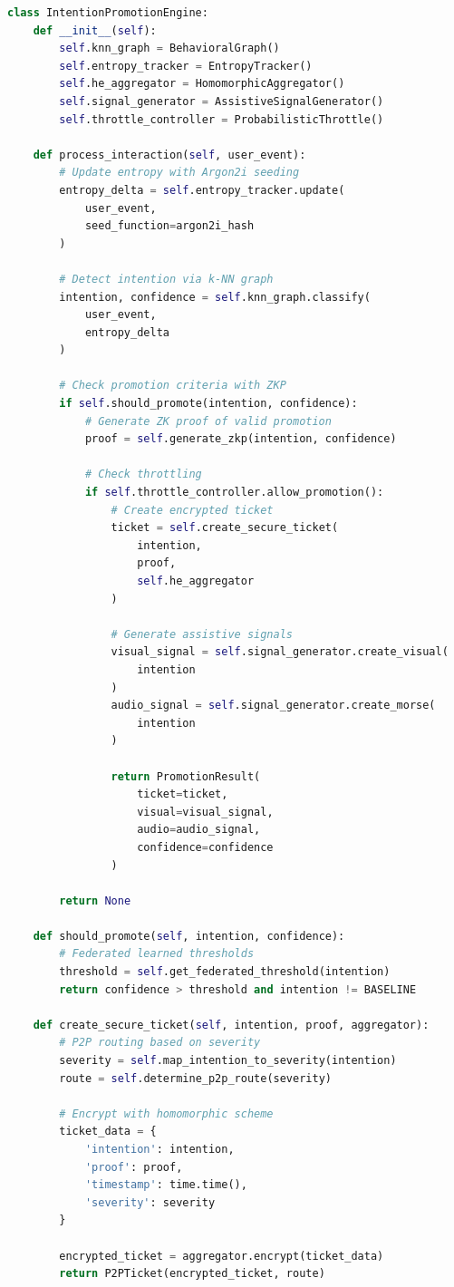 \documentclass[11pt,a4paper]{article}
\begin{document}
\begin{lstlisting}[language=Python, caption=Complete Intention Promotion Pipeline]
class IntentionPromotionEngine:
    def __init__(self):
        self.knn_graph = BehavioralGraph()
        self.entropy_tracker = EntropyTracker()
        self.he_aggregator = HomomorphicAggregator()
        self.signal_generator = AssistiveSignalGenerator()
        self.throttle_controller = ProbabilisticThrottle()
        
    def process_interaction(self, user_event):
        # Update entropy with Argon2i seeding
        entropy_delta = self.entropy_tracker.update(
            user_event, 
            seed_function=argon2i_hash
        )
        
        # Detect intention via k-NN graph
        intention, confidence = self.knn_graph.classify(
            user_event,
            entropy_delta
        )
        
        # Check promotion criteria with ZKP
        if self.should_promote(intention, confidence):
            # Generate ZK proof of valid promotion
            proof = self.generate_zkp(intention, confidence)
            
            # Check throttling
            if self.throttle_controller.allow_promotion():
                # Create encrypted ticket
                ticket = self.create_secure_ticket(
                    intention,
                    proof,
                    self.he_aggregator
                )
                
                # Generate assistive signals
                visual_signal = self.signal_generator.create_visual(
                    intention
                )
                audio_signal = self.signal_generator.create_morse(
                    intention
                )
                
                return PromotionResult(
                    ticket=ticket,
                    visual=visual_signal,
                    audio=audio_signal,
                    confidence=confidence
                )
        
        return None
    
    def should_promote(self, intention, confidence):
        # Federated learned thresholds
        threshold = self.get_federated_threshold(intention)
        return confidence > threshold and intention != BASELINE
    
    def create_secure_ticket(self, intention, proof, aggregator):
        # P2P routing based on severity
        severity = self.map_intention_to_severity(intention)
        route = self.determine_p2p_route(severity)
        
        # Encrypt with homomorphic scheme
        ticket_data = {
            'intention': intention,
            'proof': proof,
            'timestamp': time.time(),
            'severity': severity
        }
        
        encrypted_ticket = aggregator.encrypt(ticket_data)
        return P2PTicket(encrypted_ticket, route)
\end{lstlisting}
\end{document}
